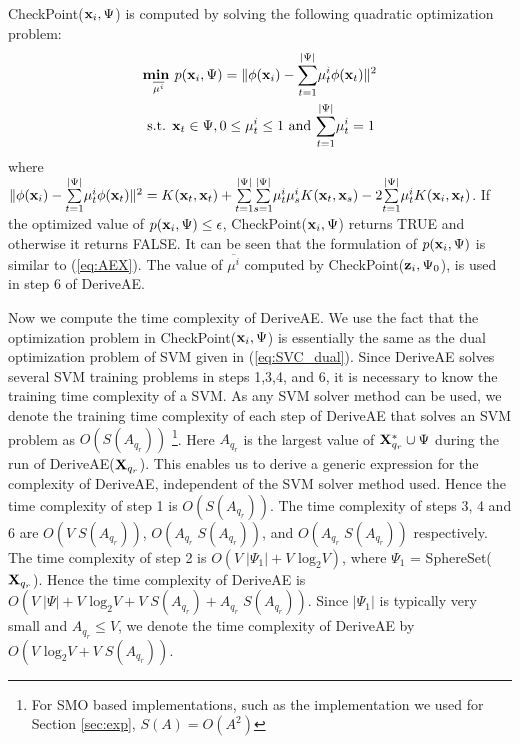 \documentclass[twoside]{article}
\begin{document}
CheckPoint(${\bf x}_i, \Psi$) is computed by solving the following quadratic optimization problem:
\begin{align*}
&\underset {\overline{\mu ^i}}{\textbf{min }} p({\bf x}_i,\Psi) = \|\phi({\bf x}_i) - \overset{|\Psi|}{\underset{t = 1}{\sum}}\mu_t ^i \phi({\bf x}_t)\|^2\\
&\text{ s.t. } {\bf x}_t \in \Psi, 0 \le \mu_t ^i \le 1 \text{ and }  \overset{|\Psi|}{\underset{t = 1}{\sum}} \mu_t ^i = 1
\end{align*}
where $\|\phi({\bf x}_i) - \overset{|\Psi|}{\underset{t = 1}{\sum}}\mu_t ^i \phi({\bf x}_t)\|^2 = K({\bf x}_t,{\bf x}_t) + \overset{|\Psi|}{\underset{t = 1}{\sum}}\overset{|\Psi|}{\underset{s = 1}{\sum}}\mu_t ^i\mu_s ^i K({\bf x}_t, {\bf x}_s) - 2 \overset{|\Psi|}{\underset{t = 1}{\sum}}\mu_t ^i K({\bf x}_i, {\bf x}_t)$. If the optimized value of $p({\bf x}_i,\Psi)\le \epsilon$, CheckPoint(${\bf x}_i, \Psi$) returns TRUE and otherwise it returns FALSE. It can be seen that the formulation of $p({\bf x}_i,\Psi)$ is similar to (\ref{eq:AEX}). The value of $\overline{\mu ^i}$ computed by CheckPoint(${\bf z}_i, \Psi_0$), is used in step 6 of DeriveAE.

Now we compute the time complexity of DeriveAE. We use the fact that the optimization problem in CheckPoint(${\bf x}_i, \Psi$) is essentially the same as the dual optimization problem of SVM given in (\ref{eq:SVC_dual}). Since DeriveAE solves several SVM training problems in steps 1,3,4, and 6, it is necessary to know the training time complexity of a SVM. As any SVM solver method can be used, we denote the training time complexity of each step of DeriveAE that solves an SVM problem as $O(S(A_{q_r}))$ \footnote{For SMO based implementations, such as the implementation we used for Section \ref{sec:exp}, $S(A) = O(A^2)$}. Here $A_{q_r}$ is the largest value of ${\bf X}_{q_r}^* \cup \Psi$ during the run of DeriveAE(${\bf X}_{q_r}$). This enables us to derive a generic expression for the complexity of DeriveAE, independent of the SVM solver method used. Hence the time complexity of step 1 is $O(S(A_{q_r}))$. The time complexity of steps 3, 4 and 6 are $O(V\;S(A_{q_r}))$, $O(A_{q_r}\;S(A_{q_r}))$, and $O(A_{q_r}\;S(A_{q_r}))$ respectively. The time complexity of step 2 is $O(V \;|\Psi_1| + V \text{ log}_2 V)$, where $\Psi_1$ = SphereSet(${\bf X}_{q_r}$). Hence the time complexity of DeriveAE is $O(V \;|\Psi| + V \text{ log}_2 V + V\;S(A_{q_r}) + A_{q_r}\;S(A_{q_r}))$. Since $|\Psi_1|$ is typically very small and $A_{q_r} \le V$, we denote the time complexity of DeriveAE by $O(V \text{ log}_2 V + V\;S(A_{q_r}))$.
\end{document}
